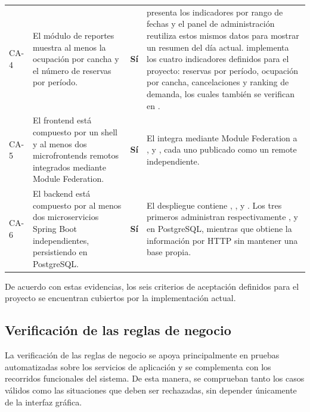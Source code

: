 \begin{xltabular}{\textwidth}{C{1.2cm} L{4.4cm} C{1.5cm} Y}
    \textsf{CA-4}\label{ca:4} &
    El módulo de reportes muestra al menos la ocupación por cancha y el número
    de reservas por período. &
    \textbf{Sí} &
     presenta los indicadores por rango de fechas y el panel de
    administración reutiliza estos mismos datos para mostrar un resumen del día
    actual.  implementa los cuatro indicadores definidos para el
    proyecto: reservas por período, ocupación por cancha, cancelaciones y ranking
    de demanda, los cuales también se verifican en . \\

    \textsf{CA-5}\label{ca:5} &
    El frontend está compuesto por un shell y al menos dos microfrontends
    remotos integrados mediante Module Federation. &
    \textbf{Sí} &
    El  integra mediante Module Federation a
    ,  y , cada uno
    publicado como un remote independiente. \\

    \textsf{CA-6}\label{ca:6} &
    El backend está compuesto por al menos dos microservicios Spring Boot
    independientes, persistiendo en PostgreSQL. &
    \textbf{Sí} &
    El despliegue contiene , ,
     y . Los tres primeros administran
    respectivamente ,  y
     en PostgreSQL, mientras que 
    obtiene la información por HTTP sin mantener una base propia. \\

\end{xltabular}
\normalsize

De acuerdo con estas evidencias, los seis criterios de aceptación definidos
para el proyecto se encuentran cubiertos por la implementación actual.

\subsection{Verificación de las reglas de negocio}
\label{sec:verificacion-reglas}

La verificación de las reglas de negocio se apoya principalmente en
pruebas automatizadas sobre los servicios de aplicación y se complementa
con los recorridos funcionales del sistema. De esta manera, se comprueban
tanto los casos válidos como las situaciones que deben ser rechazadas,
sin depender únicamente de la interfaz gráfica.

